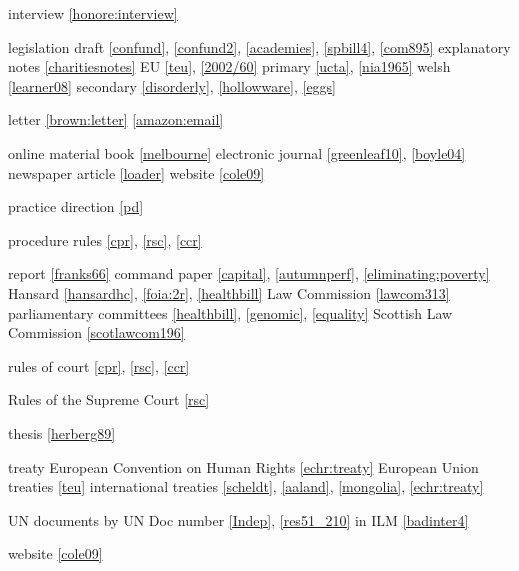 \documentclass[a4paper,
               11pt,
	       DIV=1,			   
	       footinclude=false]
	      {scrartcl}
\begin{document}
{\begin{theindex}
\item interview \ref{honore:interview}

\item legislation
\subitem draft \ref{confund}, \ref{confund2}, \ref{academies}, \ref{spbill4}, \ref{com895} 
\subitem explanatory notes \ref{charitiesnotes}
\subitem EU \ref{teu}, \ref{2002/60}
\subitem primary \ref{ucta}, \ref{nia1965}
\subsubitem welsh \ref{learner08}
\subitem secondary \ref{disorderly}, \ref{hollowware}, \ref{eggs}


\item letter \ref{brown:letter} \ref{amazon:email}

\item online material 
  \subitem book \ref{melbourne}
  \subitem electronic journal \ref{greenleaf10}, \ref{boyle04}
  \subitem newspaper article \ref{loader}
  \subitem website \ref{cole09}

\item practice direction \ref{pd}

\item procedure rules \ref{cpr}, \ref{rsc}, \ref{ccr}

\item report \ref{franks66}
\subitem command paper \ref{capital}, \ref{autumnperf}, \ref{eliminating:poverty}
\subitem Hansard \ref{hansardhc}, \ref{foia:2r}, \ref{healthbill}
\subitem Law Commission \ref{lawcom313}
\subitem parliamentary committees \ref{healthbill}, \ref{genomic}, \ref{equality}
\subitem Scottish Law Commission \ref{scotlawcom196}


\item rules of court \ref{cpr}, \ref{rsc}, \ref{ccr}

\item Rules of the Supreme Court \ref{rsc}

\item thesis \ref{herberg89}

\item treaty
  \subitem European Convention on Human Rights \ref{echr:treaty}
  \subitem European Union treaties \ref{teu}
  \subitem international treaties \ref{scheldt}, \ref{aaland}, \ref{mongolia}, \ref{echr:treaty}
  
\item UN documents
  \subitem by UN Doc number \ref{Indep}, \ref{res51_210}
  \subitem in ILM \ref{badinter4}

\item website \ref{cole09}
  

\end{theindex}
}
\end{document}
